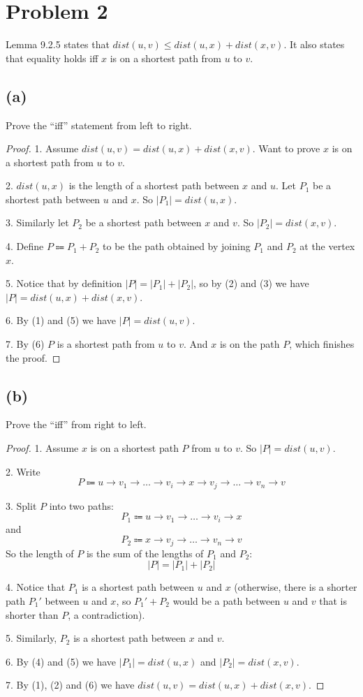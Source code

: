 \documentclass[14pt]{extarticle}
\begin{document}
\section{Problem 2}
Lemma 9.2.5 states that $dist(u, v) \leq dist(u, x) + dist(x, v)$. It also states that equality holds iff $x$ is on a shortest path from $u$ to $v$. 

\subsection{(a)}
Prove the ``iff'' statement from left to right.
\begin{proof}
1. Assume $dist(u, v) = dist(u, x) + dist(x, v)$. Want to prove $x$ is on a shortest path from $u$ to $v$.

2. $dist(u,x)$ is the length of a shortest path between $x$ and $u$. Let $P_1$ be a shortest path between $u$ and $x$. So $|P_1| = dist(u,x)$.

3. Similarly let $P_2$ be a shortest path between $x$ and $v$. So $|P_2| = dist(x,v)$.

4. Define $P \Coloneqq P_1 + P_2$ to be the path obtained by joining $P_1$ and $P_2$ at the vertex $x$.

5. Notice that by definition $|P| = |P_1| + |P_2|$, so by (2) and (3) we have $|P| = dist(u,x) + dist(x,v)$.

6. By (1) and (5) we have $|P| = dist(u,v)$.

7. By (6) $P$ is a shortest path from $u$ to $v$. And $x$ is on the path $P$, which finishes the proof.
\end{proof}

\subsection{(b)}
Prove the ``iff'' from right to left.
\begin{proof}
1. Assume $x$ is on a shortest path $P$ from $u$ to $v$. So $|P| = dist(u,v)$.

2. Write
$$
P \Coloneqq u \to v_1 \to \ldots \to v_i \to x \to v_j \to \ldots \to v_n \to v
$$

3. Split $P$ into two paths:
$$
P_1 \Coloneqq u \to v_1 \to \ldots \to v_i \to x 
$$
and
$$
P_2 \Coloneqq x \to v_j \to \ldots \to v_n \to v
$$
So the length of $P$ is the sum of the lengths of $P_1$ and $P_2$:
$$
|P| = |P_1| + |P_2|
$$

4. Notice that $P_1$ is a shortest path between $u$ and $x$ (otherwise, there is a shorter path $P_1'$ between $u$ and $x$, so $P_1' + P_2$ would be a path between $u$ and $v$ that is shorter than $P$, a contradiction).

5. Similarly, $P_2$ is a shortest path between $x$ and $v$.

6. By (4) and (5) we have $|P_1| = dist(u,x)$ and $|P_2| = dist(x,v)$.

7. By (1), (2) and (6) we have $dist(u, v) = dist(u, x) + dist(x, v)$.
\end{proof}
\end{document}
